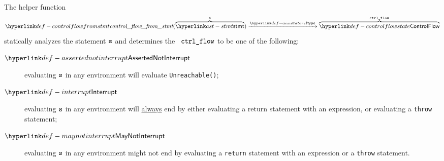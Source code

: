\hypertarget{def-controlflowfromstmt}{}
The helper function
\[
  \controlflowfromstmt(\overname{\stmt}{\vs})
  \typearrow \overname{\controlflowstate}{\vctrlflow}
\]
statically analyzes the statement $\texttt{s}$
and determines the \controlflowsymbolterm\ $\texttt{ctrl\_flow}$ to be one of the following:
\hypertarget{def-assertednotinterrupt}{}
\begin{description}
  \item[$\assertednotinterrupt$] evaluating $\texttt{s}$ in any environment will evaluate \texttt{Unreachable()};
  \hypertarget{def-interrupt}{}
  \item[$\interrupt$] evaluating $\texttt{s}$ in any environment will \underline{always} end by either evaluating
      a return statement with an expression,
      or evaluating a \texttt{throw} statement;
  \hypertarget{def-maynotinterrupt}{}
  \item[$\maynotinterrupt$] evaluating $\texttt{s}$ in any environment might not end by evaluating
      a \texttt{return} statement with an expression or a \texttt{throw} statement.
\end{description}

